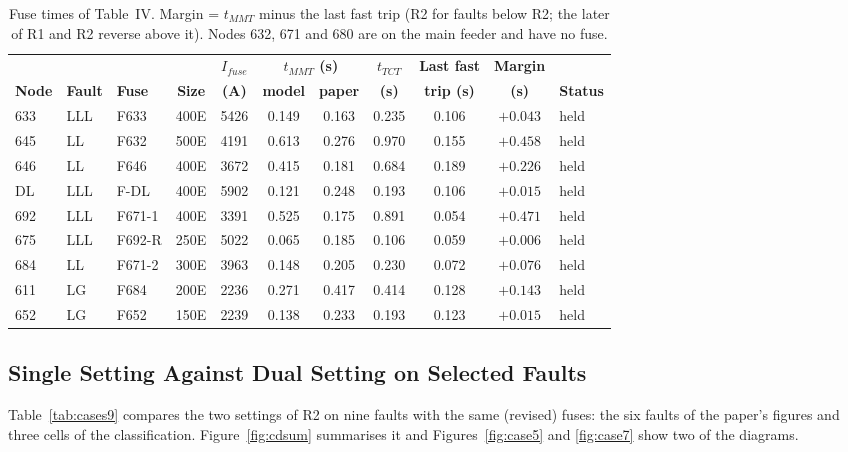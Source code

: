 \documentclass[12pt,letterpaper]{article}
\newcommand{\hd}{\rowcolor{headc}}
\begin{document}
\begin{table}[H]
\centering\footnotesize
\setlength{\tabcolsep}{4pt}
\begin{tabular}{@{}lllcccccccl@{}}
\toprule
\hd & & & & \textbf{$I_{fuse}$} & \multicolumn{2}{c}{\textbf{$t_{MMT}$ (s)}} & \textbf{$t_{TCT}$} & \textbf{Last fast} & \textbf{Margin} & \\
\hd\textbf{Node} & \textbf{Fault} & \textbf{Fuse} & \textbf{Size} & \textbf{(A)} & \textbf{model} & \textbf{paper} & \textbf{(s)} & \textbf{trip (s)} & \textbf{(s)} & \textbf{Status} \\
\midrule
633 & LLL & F633 & 400E & 5426 & 0.149 & 0.163 & 0.235 & 0.106 & $+0.043$ & held \\
645 & LL & F632 & 500E & 4191 & 0.613 & 0.276 & 0.970 & 0.155 & $+0.458$ & held \\
646 & LL & F646 & 400E & 3672 & 0.415 & 0.181 & 0.684 & 0.189 & $+0.226$ & held \\
DL & LLL & F-DL & 400E & 5902 & 0.121 & 0.248 & 0.193 & 0.106 & $+0.015$ & held \\
692 & LLL & F671-1 & 400E & 3391 & 0.525 & 0.175 & 0.891 & 0.054 & $+0.471$ & held \\
675 & LLL & F692-R & 250E & 5022 & 0.065 & 0.185 & 0.106 & 0.059 & $+0.006$ & held \\
684 & LL & F671-2 & 300E & 3963 & 0.148 & 0.205 & 0.230 & 0.072 & $+0.076$ & held \\
611 & LG & F684 & 200E & 2236 & 0.271 & 0.417 & 0.414 & 0.128 & $+0.143$ & held \\
652 & LG & F652 & 150E & 2239 & 0.138 & 0.233 & 0.193 & 0.123 & $+0.015$ & held \\
\bottomrule
\end{tabular}
\caption{Fuse times of Table~IV. Margin = $t_{MMT}$ minus the last fast trip (R2 for faults below R2; the later
of R1 and R2 reverse above it). Nodes 632, 671 and 680 are on the main feeder and have no fuse.}
\label{tab:t4b}
\end{table}

\subsection{Single Setting Against Dual Setting on Selected Faults}
Table~\ref{tab:cases9} compares the two settings of R2 on nine faults with the same (revised) fuses: the six
faults of the paper's figures and three cells of the classification. Figure~\ref{fig:cdsum} summarises it and
Figures~\ref{fig:case5} and \ref{fig:case7} show two of the diagrams.
\end{document}
